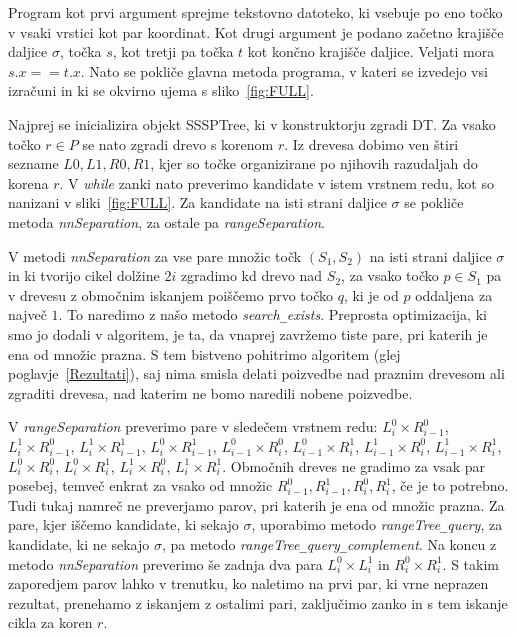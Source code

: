 \documentclass[a4paper, 12pt]{book}
\newcommand{\U}{\texttt{\_}}
\begin{document}
Program kot prvi argument sprejme tekstovno datoteko, ki vsebuje po eno točko v vsaki vrstici kot par koordinat. Kot drugi argument je podano začetno krajišče daljice $\sigma$, točka $s$, kot tretji pa točka $t$ kot končno krajišče daljice. Veljati mora $s.x == t.x$. Nato se pokliče glavna metoda programa, v kateri se izvedejo vsi izračuni in ki se okvirno ujema s sliko~\ref{fig:FULL}.

Najprej se inicializira objekt SSSPTree, ki v konstruktorju zgradi DT. Za vsako točko $r\in P$ se nato zgradi drevo s korenom $r$. Iz drevesa dobimo ven štiri sezname $L0, L1, R0, R1$, kjer so točke organizirane po njihovih razudaljah do korena $r$. V \textit{while} zanki nato preverimo kandidate v istem vrstnem redu, kot so nanizani v sliki~\ref{fig:FULL}. Za kandidate na isti strani daljice $\sigma$ se pokliče metoda \textit{nnSeparation}, za ostale pa \textit{rangeSeparation}.

V metodi \textit{nnSeparation} za vse pare množic točk $(S_1, S_2)$ na isti strani daljice $\sigma$ in ki tvorijo cikel dolžine $2i$ zgradimo kd drevo nad $S_2$, za vsako točko $p\in S_1$ pa v drevesu z območnim iskanjem poiščemo prvo točko $q$, ki je od $p$ oddaljena za največ $1$. To naredimo z našo metodo \textit{search\U exists}. Preprosta optimizacija, ki smo jo dodali v algoritem, je ta, da vnaprej zavržemo tiste pare, pri katerih je ena od množic prazna. S tem bistveno pohitrimo algoritem (glej poglavje~\ref{Rezultati}), saj nima smisla delati poizvedbe nad praznim drevesom ali zgraditi drevesa, nad katerim ne bomo naredili nobene poizvedbe.

V \textit{rangeSeparation} preverimo pare v sledečem vrstnem redu: $L_i^0\times R_{i-1}^0$, $L_i^1\times R_{i-1}^0$, $L_i^1\times R_{i-1}^1$, $L_i^0\times R_{i-1}^1$, $L_{i-1}^0\times R_{i}^0$, $L_{i-1}^0\times R_{i}^1$, $L_{i-1}^1\times R_{i}^0$, $L_{i-1}^1\times R_{i}^1$, $L_{i}^0\times R_{i}^0$, $L_{i}^0\times R_{i}^1$, $L_{i}^1\times R_{i}^0$, $L_{i}^1\times R_{i}^1$. Območnih dreves ne gradimo za vsak par posebej, temveč enkrat za vsako od množic $R_{i-1}^0, R_{i-1}^1, R_{i}^0, R_{i}^1$, če je to potrebno. Tudi tukaj namreč ne preverjamo parov, pri katerih je ena od množic prazna. Za pare, kjer iščemo kandidate, ki sekajo $\sigma$, uporabimo metodo \textit{rangeTree\U query}, za kandidate, ki ne sekajo $\sigma$, pa metodo \textit{rangeTree\U query\U complement}. Na koncu z metodo \textit{nnSeparation} preverimo še zadnja dva para $L_i^0\times L_i^1$ in $R_i^0\times R_i^1$. S takim zaporedjem parov lahko v trenutku, ko naletimo na prvi par, ki vrne neprazen rezultat, prenehamo z iskanjem z ostalimi pari, zaključimo zanko in s tem iskanje cikla za koren $r$.
\end{document}
